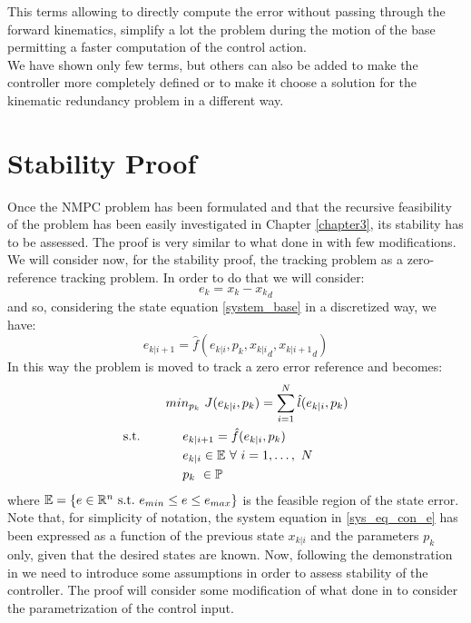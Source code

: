 This terms allowing to directly compute the error without passing through the forward kinematics, simplify a lot the problem during the motion of the base permitting a faster computation of the control action.\\We have shown only few terms, but others can also be added to make the controller more completely defined or to make it choose a solution for the kinematic redundancy problem in a different way. 

\section{Stability Proof}\label{stabproof}

Once the NMPC problem has been formulated and that the recursive feasibility of the problem has been easily investigated in Chapter \ref{chapter3}, its stability has to be assessed. 
The proof is very similar to what done in \cite{alamir2018stability} with few modifications. We will consider now, for the stability proof, the tracking problem as a zero-reference tracking problem. In order to do that we will consider:
\begin{equation}
    e_k=x_k-{x_k}_d
\end{equation}
and so, considering the state equation \ref{system_base} in a discretized way, we have:
\begin{equation}\label{sys_eq_con_e}
    e_{k|i+1}=\hat{f}(e_{k|i},p_k,{x_{k|i}}_d,{x_{k|i+1}}_d)
\end{equation}
In this way the problem is moved to track a zero error reference and becomes: 
\begin{equation} \label{ourproblem_stab}
\begin{split}
		& min_{{p}_k}\ J({e}_{k|i},{p}_k) =\sum_{i=1}^{N}\hat{l}(e_{k|i},{p}_{k}) \\
		\textnormal{s.t.}\qquad
		&\ \ \ \ e_{k|i+1}=\hat{f}(e_{k|i},p_k) \\
		&\ \ \ \ e_{k|i} \in \mathbb{E}\ \forall\ i=1,\dots,\ N  \\
		&\ \ \ \ {p}_k\   \in \mathbb{P}\ \\
	\end{split}	
\end{equation}
where $\mathbb{E} = \lbrace {e}\in \mathbb{R}^n\ \textnormal{s.t.}\ {e}_{min}\leq e\leq e_{max} \rbrace$ is the feasible region of the state error. Note that, for simplicity of notation, the system equation in \ref{sys_eq_con_e} has been expressed as a function of the previous state ${x_{k|i}}$ and the parameters $p_k$ only, given that the desired states are known.
Now, following the demonstration in \cite{alamir2018stability} we need to introduce some assumptions in order to assess stability of the controller. The proof will consider some modification of what done in \cite{alamir2018stability} to consider the parametrization of the control input. 

